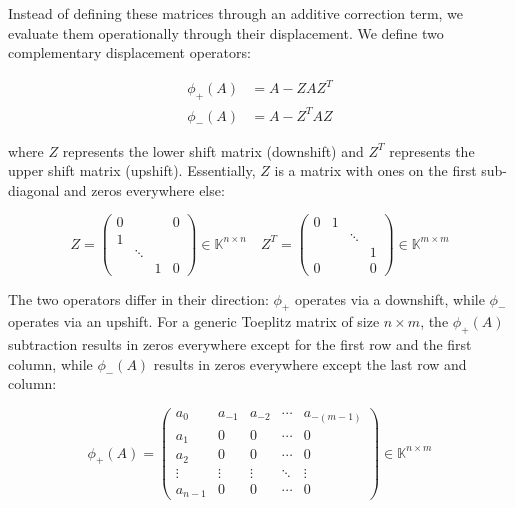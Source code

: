 Instead of defining these matrices through an additive correction
term, we evaluate them operationally through their displacement. We
define two complementary displacement operators:

\begin{equation}
  \label{eq:displacement_formula}
  \begin{aligned}
    \phi_+(A) &= A - Z A Z^T \\
    \phi_-(A) &= A - Z^T A Z
  \end{aligned}
\end{equation}

where $Z$ represents the lower shift matrix (downshift) and $Z^T$
represents the upper shift matrix (upshift). Essentially, $Z$ is a
matrix with ones on the first sub-diagonal and zeros everywhere else:

\begin{equation*}
  Z =
  \begin{pmatrix}
    0       &           &   &0  \\
    1       &           &   &  \\
    & \ddots    &   &  \\
    &           & 1 & 0
  \end{pmatrix} \in \mathbb{K}^{n \times n}
  \quad
  Z^{T} =
  \begin{pmatrix}
    0       & 1         &       &  \\
    &           &\ddots &  \\
    &           &       & 1\\
    0&           &       & 0
  \end{pmatrix} \in \mathbb{K}^{m \times m}
\end{equation*}

The two operators differ in their direction: $\phi_+$ operates via a
downshift, while $\phi_-$ operates via an upshift. For a generic
Toeplitz matrix of size $n \times m$, the $\phi_+(A)$ subtraction
results in zeros everywhere except for the first row and the first
column, while $\phi_-(A)$ results in zeros everywhere except the last
row and column:

\begin{equation*}
  \phi_+(A) =
  \begin{pmatrix}
    a_0     & a_{-1}    & a_{-2}    & \cdots & a_{-(m-1)} \\
    a_1     & 0      & 0      & \cdots & 0       \\
    a_2     & 0      & 0      & \cdots & 0       \\
    \vdots  & \vdots & \vdots & \ddots & \vdots  \\
    a_{n-1} & 0      & 0      & \cdots & 0
  \end{pmatrix} \in \mathbb{K}^{n \times m}
\end{equation*}

